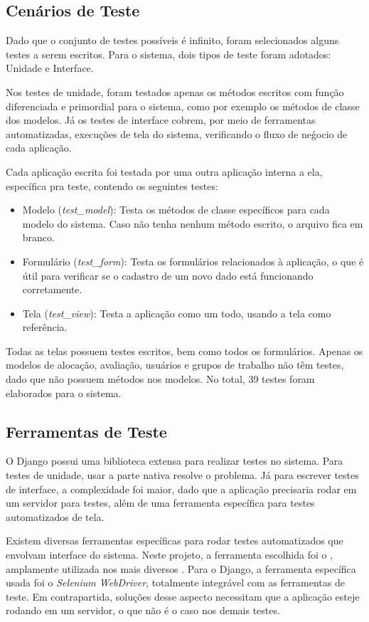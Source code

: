 \subsection{Cenários de Teste}
Dado que o conjunto de testes possíveis é infinito, foram selecionados alguns testes a serem escritos. Para o sistema, dois tipos de teste foram adotados: Unidade e Interface. 

Nos testes de unidade, foram testados apenas os métodos escritos com função diferenciada e primordial para o sistema, como por exemplo os métodos de classe dos modelos. Já os testes de interface cobrem, por meio de ferramentas automatizadas, execuções de tela do sistema, verificando o fluxo de neǵocio de cada aplicação.

Cada aplicação escrita foi testada por uma outra aplicação interna a ela, específica pra teste, contendo os seguintes testes:

\begin{itemize}
    \item Modelo (\textit{test\_model}): Testa os métodos de classe específicos para cada modelo do sistema. Caso não tenha nenhum método escrito, o arquivo fica em branco.
    \item Formulário (\textit{test\_form}): Testa os formulários relacionados à aplicação, o que é útil para verificar se o cadastro de um novo dado está funcionando corretamente.
    \item Tela (\textit{test\_view}): Testa a aplicação como um todo, usando a tela como referência.
\end{itemize}

Todas as telas possuem testes escritos, bem como todos os formulários. Apenas os modelos de alocação, avaliação, usuários e grupos de trabalho não têm testes, dado que não possuem métodos nos modelos. No total, 39 testes foram elaborados para o sistema.

\subsection{Ferramentas de Teste}
O Django possui uma biblioteca extensa para realizar testes no sistema. Para testes de unidade, usar a parte nativa resolve o problema. Já para escrever testes de interface, a complexidade foi maior, dado que a aplicação precisaria rodar em um servidor para testes, além de uma ferramenta específica para testes automatizados de tela.

Existem diversas ferramentas específicas para rodar testes automatizados que envolvam interface do sistema. Neste projeto, a ferramenta escolhida foi o , amplamente utilizada nos mais diversos . Para o Django, a ferramenta específica usada foi o \textit{Selenium WebDriver}, totalmente integrável com as ferramentas de teste. Em contrapartida, soluções desse aspecto necessitam que a aplicação esteje rodando em um servidor, o que não é o caso nos demais testes.


